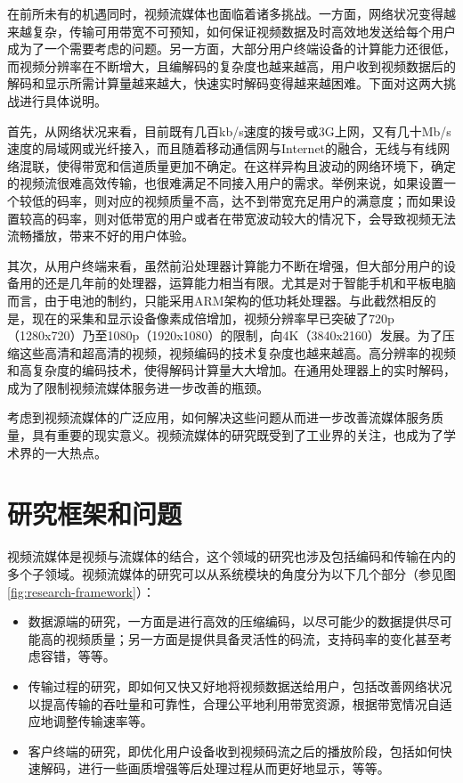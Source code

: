 在前所未有的机遇同时，视频流媒体也面临着诸多挑战。一方面，网络状况变得越来越复杂，传输可用带宽不可预知，如何保证视频数据及时高效地发送给每个用户成为了一个需要考虑的问题。另一方面，大部分用户终端设备的计算能力还很低，而视频分辨率在不断增大，且编解码的复杂度也越来越高，用户收到视频数据后的解码和显示所需计算量越来越大，快速实时解码变得越来越困难。下面对这两大挑战进行具体说明。

首先，从网络状况来看，目前既有几百kb/s速度的拨号或3G上网，又有几十Mb/s速度的局域网或光纤接入，而且随着移动通信网与Internet的融合，无线与有线网络混联，使得带宽和信道质量更加不确定。在这样异构且波动的网络环境下，确定的视频流很难高效传输，也很难满足不同接入用户的需求。举例来说，如果设置一个较低的码率，则对应的视频质量不高，达不到带宽充足用户的满意度；而如果设置较高的码率，则对低带宽的用户或者在带宽波动较大的情况下，会导致视频无法流畅播放，带来不好的用户体验。

其次，从用户终端来看，虽然前沿处理器计算能力不断在增强，但大部分用户的设备用的还是几年前的处理器，运算能力相当有限。尤其是对于智能手机和平板电脑而言，由于电池的制约，只能采用ARM架构的低功耗处理器。与此截然相反的是，现在的采集和显示设备像素成倍增加，视频分辨率早已突破了720p（1280x720）乃至1080p（1920x1080）的限制，向4K（3840x2160）发展。为了压缩这些高清和超高清的视频，视频编码的技术复杂度也越来越高。高分辨率的视频和高复杂度的编码技术，使得解码计算量大大增加。在通用处理器上的实时解码，成为了限制视频流媒体服务进一步改善的瓶颈。

考虑到视频流媒体的广泛应用，如何解决这些问题从而进一步改善流媒体服务质量，具有重要的现实意义。视频流媒体的研究既受到了工业界的关注，也成为了学术界的一大热点。

\section{研究框架和问题}

视频流媒体是视频与流媒体的结合，这个领域的研究也涉及包括编码和传输在内的多个子领域。视频流媒体的研究可以从系统模块的角度分为以下几个部分（参见图\ref{fig:research-framework}）：
\begin{itemize}
	\item 数据源端的研究，一方面是进行高效的压缩编码，以尽可能少的数据提供尽可能高的视频质量；另一方面是提供具备灵活性的码流，支持码率的变化甚至考虑容错，等等。
	\item 传输过程的研究，即如何又快又好地将视频数据送给用户，包括改善网络状况以提高传输的吞吐量和可靠性，合理公平地利用带宽资源，根据带宽情况自适应地调整传输速率等。
	\item 客户终端的研究，即优化用户设备收到视频码流之后的播放阶段，包括如何快速解码，进行一些画质增强等后处理过程从而更好地显示，等等。
\end{itemize}


